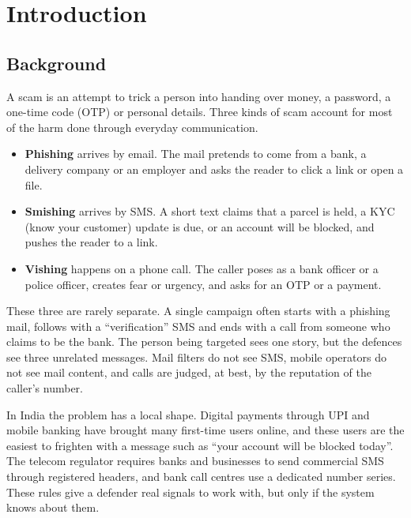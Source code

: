 \chapter{Introduction}\thispagestyle{thesisstyle} %

\graphicspath{{Chapter1/figures/}}
{

\section{Background}
A scam is an attempt to trick a person into handing over money, a password, a one-time code (OTP) or personal details. Three kinds of scam account for most of the harm done through everyday communication.
\begin{itemize}
\item \textbf{Phishing} arrives by email. The mail pretends to come from a bank, a delivery company or an employer and asks the reader to click a link or open a file.
\item \textbf{Smishing} arrives by SMS. A short text claims that a parcel is held, a KYC (know your customer) update is due, or an account will be blocked, and pushes the reader to a link.
\item \textbf{Vishing} happens on a phone call. The caller poses as a bank officer or a police officer, creates fear or urgency, and asks for an OTP or a payment.
\end{itemize}
These three are rarely separate. A single campaign often starts with a phishing mail, follows with a ``verification'' SMS and ends with a call from someone who claims to be the bank. The person being targeted sees one story, but the defences see three unrelated messages. Mail filters do not see SMS, mobile operators do not see mail content, and calls are judged, at best, by the reputation of the caller's number.

In India the problem has a local shape. Digital payments through UPI and mobile banking have brought many first-time users online, and these users are the easiest to frighten with a message such as ``your account will be blocked today''. The telecom regulator requires banks and businesses to send commercial SMS through registered headers, and bank call centres use a dedicated number series. These rules give a defender real signals to work with, but only if the system knows about them.

}
